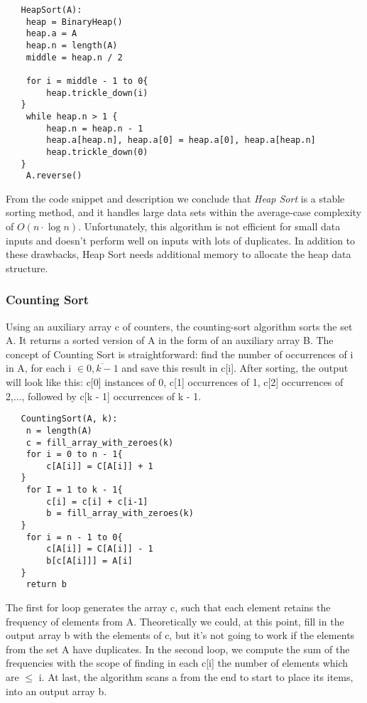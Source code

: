 \documentclass[11pt, letter paper]{article}
\begin{document}
        \begin{lstlisting}
   HeapSort(A):
	heap = BinaryHeap()
	heap.a = A
	heap.n = length(A)
	middle = heap.n / 2

	for i = middle - 1 to 0{
		heap.trickle_down(i)
   }
	while heap.n > 1 {
		heap.n = heap.n - 1
		heap.a[heap.n], heap.a[0] = heap.a[0], heap.a[heap.n]
		heap.trickle_down(0)
   }
	A.reverse()
        \end{lstlisting}
        From the code snippet and description we conclude that \emph{Heap Sort} is a stable sorting method, and it handles large data sets within the average-case complexity of $O(n \cdot \log n)$. Unfortunately, this algorithm is not efficient for small data inputs and doesn't perform well on inputs with lots of duplicates. In addition to these drawbacks, Heap Sort needs additional memory to allocate the heap data structure.

        \subsubsection{Counting Sort}
        Using an auxiliary array c of counters, the counting-sort algorithm sorts the set A. It returns a sorted version of A in the form of an auxiliary array B. The concept of Counting Sort is  straightforward: find the number of occurrences of i in A, for each i $\in \overline{0, k - 1}$  and save this result in c[i]. After sorting, the output will look like this: c[0] instances of 0, c[1] occurrences of 1, c[2] occurrences of 2,..., followed by c[k - 1] occurrences of k - 1.

         \begin{lstlisting}
   CountingSort(A, k):
	n = length(A)
	c = fill_array_with_zeroes(k)
	for i = 0 to n - 1{
		c[A[i]] = C[A[i]] + 1
   }
	for I = 1 to k - 1{
		c[i] = c[i] + c[i-1]
		b = fill_array_with_zeroes(k)
   }
	for i = n - 1 to 0{
		c[A[i]] = C[A[i]] - 1
		b[c[A[i]]] = A[i]
   }
	return b	
        \end{lstlisting}
        The first for loop generates the array c, such that each element retains the frequency of elements from A. Theoretically we could, at this point, fill in the output array b with the elements of c, but it’s not going to work if the elements from the set A have duplicates. In the second loop, we compute the sum of the frequencies with the scope of finding in each c[i] the number of elements which are $\leq$ i. At last, the algorithm scans a from the end to start to place its items, into an output array b.
\end{document}
